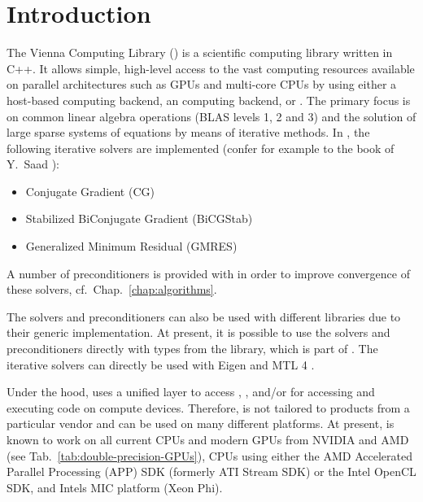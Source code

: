 
\chapter*{Introduction}   

The Vienna Computing Library (\ViennaCL) is a scientific computing
library written in C++. It allows simple, high-level access
to the vast computing resources available on parallel architectures such as
GPUs and multi-core CPUs by using either a host-based computing backend, an {\OpenCL} computing backend, or {\CUDA}.
The primary focus is on common linear algebra
operations (BLAS levels 1, 2 and 3) and the solution of large sparse systems of equations by means of iterative
methods. In {\ViennaCLminorversion}, the following iterative solvers are
implemented (confer for example to the book of Y.~Saad \cite{saad-iterative-solution}):
\begin{itemize}
 \item Conjugate Gradient (CG)
 \item Stabilized BiConjugate Gradient (BiCGStab)
 \item Generalized Minimum Residual (GMRES)
\end{itemize}
A number of preconditioners is provided with {\ViennaCLversion} in order to improve convergence of these solvers, cf.~Chap.~\ref{chap:algorithms}.

The solvers and preconditioners can also be used with different
libraries due to their generic implementation. At present, it is possible to
use the solvers and preconditioners directly with types from the {\ublas} library, which is part of 
{\Boost} \cite{boost}. The iterative solvers can directly be used with Eigen \cite{eigen} and MTL 4 \cite{mtl4}.

Under the hood, {\ViennaCL} uses a unified layer to access {\CUDA} \cite{nvidiacuda}, {\OpenCL} \cite{khronoscl}, and/or {\OpenMP} \cite{openmp} for accessing and
executing code on compute devices. Therefore, {\ViennaCL} is not tailored 
to products from a particular vendor and can be used on many different
platforms. At present, {\ViennaCL} is known to work on all current CPUs and modern GPUs from NVIDIA
and AMD (see Tab.~\ref{tab:double-precision-GPUs}), CPUs 
using either the AMD Accelerated Parallel Processing (APP) SDK (formerly ATI Stream SDK) or the Intel OpenCL SDK, and Intels MIC platform (Xeon Phi).


